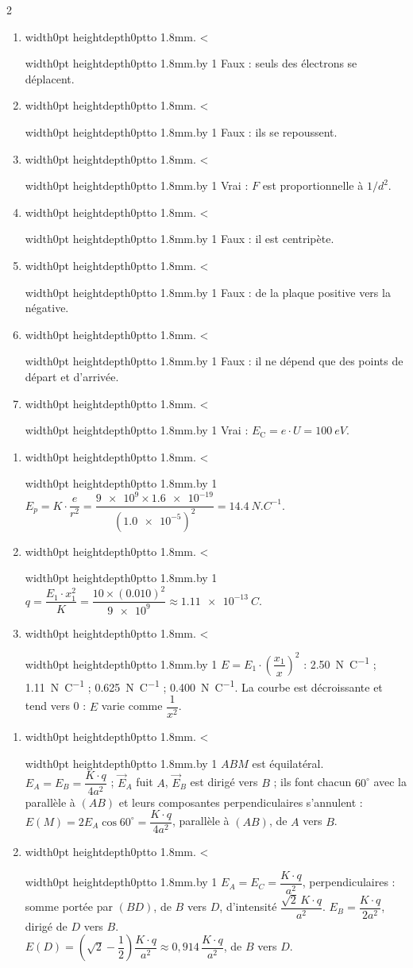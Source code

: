 \documentclass[11pt,a4paper]{article}
\newcommand{\vect}[1]{\overrightarrow{#1}}
\newcommand{\Ec}{E_{\mathrm{C}}}
\newif\ifeleve
\newlength{\interligne}\setlength{\interligne}{7mm}
\newlength{\replen}
\newcommand{\pointilles}{{\color{cInk2!60}\leaders\hbox to 1.8mm{\hss.\hss}\hfill}\kern0pt}
\newcommand{\lignes}[1]{\leavevmode\vrule width0pt height\dimexpr\interligne-1mm\relax depth0pt\pointilles
  \lgn=1 \loop\ifnum\lgn<#1 \par\nointerlineskip\noindent\vrule width0pt height\interligne depth0pt\pointilles\advance\lgn by 1 \repeat}
\newcommand{\rep}[1]{%
  \ifeleve
    \sbox{\repbox}{\parbox{\linewidth}{#1}}%
    \replen=\dimexpr\ht\repbox+\dp\repbox\relax
    \repn=\numexpr\replen/\baselineskip+1\relax
    \ifnum\repn<2 \repn=2\fi
    \edef\nblignes{\the\repn}\lignes{\nblignes}%
  \else #1\fi}
\begin{document}
\begin{multicols}{2}
\begin{enumerate}[label={\sffamily\bfseries\alph*)},leftmargin=5mm,itemsep=0pt]
  \item \rep{Faux : seuls des électrons se déplacent.}
  \item \rep{Faux : ils se repoussent.}
  \item \rep{Vrai : $F$ est proportionnelle à $1/d^2$.}
  \item \rep{Faux : il est centripète.}
  \item \rep{Faux : de la plaque positive vers la négative.}
  \item \rep{Faux : il ne dépend que des points de départ et d’arrivée.}
  \item \rep{Vrai : $\Ec = e\cdot U = \qty{100}{eV}$.}
\end{enumerate}

\begin{enumerate}[label={\sffamily\bfseries\arabic*.},leftmargin=5mm,itemsep=1pt]
  \item \rep{$E_p = K\cdot\dfrac{e}{r^2} = \dfrac{\num{9e9}\times\num{1,6e-19}}{(\num{1,0e-5})^2} = \qty{14,4}{N.C^{-1}}$.}
  \item \rep{$q = \dfrac{E_1\cdot x_1^2}{K} = \dfrac{10\times(\num{0,010})^2}{\num{9e9}} \approx \qty{1,11e-13}{C}$.}
  \item \rep{$E = E_1\cdot\left(\dfrac{x_1}{x}\right)^2$ : \qty{2,50}{N.C^{-1}} ; \qty{1,11}{N.C^{-1}} ; \qty{0,625}{N.C^{-1}} ; \qty{0,400}{N.C^{-1}}. La courbe est décroissante et tend vers 0 : $E$ varie comme $\dfrac{1}{x^2}$.}
\end{enumerate}

\begin{enumerate}[label={\sffamily\bfseries\arabic*.},leftmargin=5mm,itemsep=1pt]
  \item \rep{$ABM$ est équilatéral. $E_A = E_B = \dfrac{K\cdot q}{4a^2}$ ; $\vect{E}_A$ fuit $A$, $\vect{E}_B$ est dirigé vers $B$ ; ils font chacun $60^\circ$ avec la parallèle à $(AB)$ et leurs composantes perpendiculaires s’annulent :\\ $E(M) = 2E_A\cos60^\circ = \dfrac{K\cdot q}{4a^2}$, parallèle à $(AB)$, de $A$ vers $B$.}
  \item \rep{$E_A = E_C = \dfrac{K\cdot q}{a^2}$, perpendiculaires : somme portée par $(BD)$, de $B$ vers $D$, d’intensité $\dfrac{\sqrt2\,K\cdot q}{a^2}$. $E_B = \dfrac{K\cdot q}{2a^2}$, dirigé de $D$ vers $B$.\\ $E(D) = \left(\sqrt2 - \dfrac{1}{2}\right)\dfrac{K\cdot q}{a^2} \approx 0{,}914\,\dfrac{K\cdot q}{a^2}$, de $B$ vers $D$.}
\end{enumerate}


\end{multicols}
\end{document}
